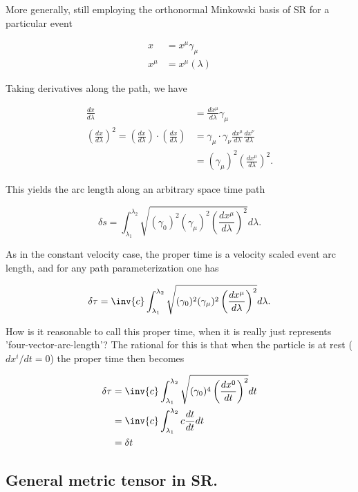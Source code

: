 \documentclass{article}      %
\begin{document}
More generally, still employing the orthonormal Minkowski basis of SR for a particular event

\begin{align*}
x &= x^{\mu} \gamma_{\mu} \\
x^{\mu} &= x^{\mu}(\lambda)
\end{align*}

Taking derivatives along the path, we have

\begin{align*}
\frac{dx}{d\lambda} &= \frac{dx^{\mu}}{d\lambda} \gamma_{\mu} \\
\left(\frac{dx}{d\lambda}\right)^2 = \left(\frac{dx}{d\lambda}\right) \cdot \left(\frac{dx}{d\lambda}\right)
&= \gamma_{\mu} \cdot \gamma_{\nu} \frac{dx^{\mu}}{d\lambda} \frac{dx^{\nu}}{d\lambda} \\
&= (\gamma_{\mu})^2 \left( \frac{dx^{\mu}}{d\lambda} \right)^2.
\end{align*}

This yields the arc length along an arbitrary space time path

\begin{equation*}
\delta s = \int_{\lambda_1}^{\lambda_2} \sqrt{ (\gamma_{0})^2 (\gamma_{\mu})^2 \left( \frac{dx^{\mu}}{d\lambda} \right)^2} d\lambda.
\end{equation*}

As in the constant velocity case, the proper time is a velocity scaled event arc length, and for any path parameterization one has

\begin{equation}
\delta \tau = \inv{c} \int_{\lambda_1}^{\lambda_2} \sqrt{ (\gamma_{0})^2 (\gamma_{\mu})^2 \left( \frac{dx^{\mu}}{d\lambda} \right)^2} d\lambda.
\end{equation}

How is it reasonable to call this proper time, when it is really just represents 'four-vector-arc-length'?  The rational for this is that when the particle is at rest ($dx^i/dt = 0$) the proper time then becomes

\begin{align*}
\delta \tau 
&= \inv{c} \int_{\lambda_1}^{\lambda_2} \sqrt{ (\gamma_{0})^4 \left(\frac{dx^0}{dt}\right)^2} dt \\
&= \inv{c} \int_{\lambda_1}^{\lambda_2} c \frac{dt}{dt} dt \\
&= \delta t
\end{align*}

\subsection{ General metric tensor in SR. }
\end{document}
